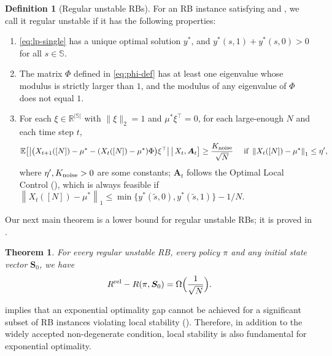 \documentclass[11pt,letterpaper]{article}
\theoremstyle{plain}
\newtheorem{theorem}{Theorem}
\theoremstyle{definition}
\newtheorem{definition}{Definition}
\theoremstyle{remark}
\newcommand{\norm}[1]{\left\lVert#1\right\rVert}
\newcommand{\normplain}[1]{\lVert#1\rVert}
\newcommand{\Ebig}[1]{\mathbb{E}\big[#1\big]}
\newcommand{\givenbig}{\,\big|\,}
\newcommand{\R}{\mathbb{R}}
\newcommand{\absbig}[1]{\big\lvert#1\big\rvert}
\newcommand{\ve}[1]{\bm{#1}}
\newcommand{\veS}{\ve{S}}
\newcommand{\veA}{\ve{A}}
\newcommand{\sspa}{\mathbb{S}}
\newcommand{\rel}{\textup{rel}} %
\newcommand{\ravg}{R}
\newcommand{\rsysn}{\ravg(\pi, \veS_0)}
\newcommand{\rrel}{\ravg^\rel}
\newcommand{\statdist}{\mu^*}
\newcommand{\sneu}{\tilde{s}}
\newcommand{\radiusus}{\eta'}
\newcommand{\noiseortho}{K_{\textup{noise}}}
\begin{document}
\begin{definition}[Regular unstable RBs]
    \label{def:regular-unstable}
    For an RB instance satisfying  and , we call it regular unstable if it has the following properties: 
    \begin{enumerate}[leftmargin=2em, label=(\alph*)]
        \item \label{assump:unique-and-communicating}
        \eqref{eq:lp-single} has a unique optimal solution $y^*$, and $y^*(s,1) + y^*(s,0) > 0$ for all $s\in\sspa$. 
        \item \label{assump:instability}
        The matrix $\Phi$ defined in \eqref{eq:phi-def} has at least one eigenvalue whose modulus is strictly larger than $1$, and the modulus of any eigenvalue of $\Phi$ does not equal $1$. 
        \item \label{assump:orthogonal-noise}
        For each $\xi \in \R^{|\sspa|}$ with $\normplain{\xi}_2 = 1$ and $\statdist \xi^\top = 0$, for each large-enough $N$  and each time step $t$, 
        \begin{equation*}
            \Ebig{\absbig{\big(X_{t+1}([N]) - \statdist - (X_t([N]) - \statdist)\Phi \big)  \xi^\top } \givenbig X_t, \veA_t} \geq \frac{\noiseortho}{\sqrt{N}} \quad \text{ if } \norm{X_t([N]) - \statdist}_1 \leq \radiusus,
        \end{equation*}
        where $\radiusus, \noiseortho > 0$ are some constants; $\veA_t$ follows the Optimal Local Control (), which is always feasible if $\norm{X_t([N]) - \statdist}_1 \leq \min\{y^*(\sneu, 0), y^*(\sneu, 1)\}-1/N$. 
        \end{enumerate}
\end{definition}


Our next main theorem is a lower bound for regular unstable RBs; it is proved in .


\begin{theorem}\label{thm:instability-lower-bound}
    For every regular unstable RB, every policy $\pi$ and any initial state vector $\veS_0$, we have
    \[
        \rrel - \rsysn = \Omega\Big(\frac{1}{\sqrt{N}}\Big).
    \] 
\end{theorem}



 implies that an exponential optimality gap cannot be achieved for a significant subset of  RB instances violating local stability ().
Therefore, in addition to the widely accepted non-degenerate condition, local stability is also fundamental for exponential  optimality. 
\end{document}

